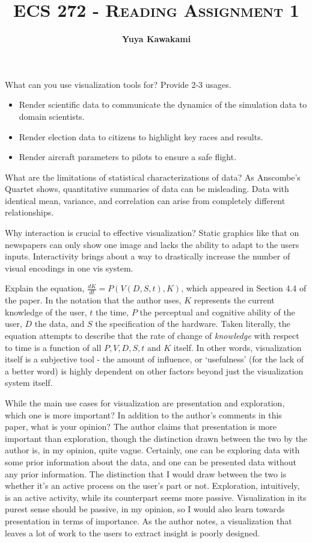 \documentclass[12pt]{Homework}
\title{\footnotesize\textsc{ECS 272 - Reading Assignment 1}}
\author{\textbf{Yuya Kawakami}}
\begin{document}
What can you use visualization tools for?  Provide 2-3 usages.
\solution{}
\begin{itemize}
    \item Render scientific data to communicate the dynamics of the simulation data to domain scientists.
    \item Render election data to citizens to highlight key races and results.
    \item Render aircraft parameters to pilots to ensure a safe flight.
\end{itemize}
    
What are the limitations of statistical characterizations of data?
\solution{}
As Anscombe's Quartet shows, quantitative summaries of data can be misleading. Data with identical mean, variance, and correlation can arise from completely different relationships.

Why interaction is crucial to effective visualization?
\solution{}
Static graphics like that on newspapers can only show one image and lacks the ability to adapt to the users inputs. Interactivity brings about a way to drastically increase the number of visual encodings in one vis system.

Explain the equation, $\frac{dK}{dt}=P(V(D,S,t), K)$, which appeared in Section 4.4 of the paper.
\solution{}
In the notation that the author uses, $K$ represents the current knowledge of the user, $t$ the time, $P$ the perceptual and cognitive ability of the user, $D$ the data, and $S$ the specification of the hardware.
Taken literally, the equation attempts to describe that the rate of change of \textit{knowledge} with respect to time is a function of all $P,V,D,S,t$ and $K$ itself. In other words, visualization itself is a subjective tool - the amount of influence, or `usefulness' (for the lack of a better word) is highly dependent on other factors beyond just the visualization system itself.

While the main use cases for visualization are presentation and exploration, which one is more important? In addition to the author's comments in this paper, what is your opinion?
\solution{}
The author claims that presentation is more important than exploration, though the distinction drawn between the two by the author is, in my opinion, quite vague. Certainly, one can be exploring data with some prior information about the data, and one can be presented data without any prior information. The distinction that I would draw between the two is whether it's an active process on the user's part or not. Exploration, intuitively, is an active activity, while its counterpart
seems more passive. Visualization in its purest sense should be passive, in my opinion, so I would also learn towards presentation in terms of importance. As the author notes, a visualization that leaves a lot of work to the users to extract insight is poorly designed.
\end{document}
